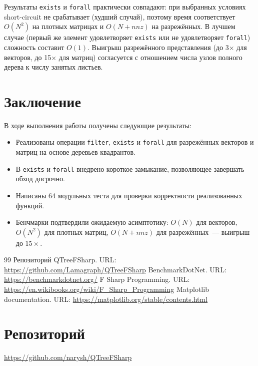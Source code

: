 \documentclass[a4paper]{article}
\begin{document}
Результаты \texttt{exists} и \texttt{forall} практически совпадают: при выбранных условиях short-circuit не срабатывает (худший случай), поэтому время соответствует $O(N^2)$ на плотных матрицах и $O(N+nnz)$ на разрежённых. В лучшем случае (первый же элемент удовлетворяет \texttt{exists} или не удовлетворяет \texttt{forall}) сложность составит $O(1)$. Выигрыш разрежённого представления (до 3× для векторов, до 15× для матриц) согласуется с отношением числа узлов полного дерева к числу занятых листьев.

\section{Заключение}

В ходе выполнения работы получены следующие результаты:

\begin{itemize}
    \item Реализованы операции \texttt{filter}, \texttt{exists} и \texttt{forall} для разрежённых векторов и матриц на основе деревьев квадрантов.
    \item В \texttt{exists} и \texttt{forall} внедрено короткое замыкание, позволяющее завершать обход досрочно.
    \item Написаны 64 модульных теста для проверки корректности реализованных функций.
    \item Бенчмарки подтвердили ожидаемую асимптотику: $O(N)$ для векторов, $O(N^2)$ для плотных матриц, $O(N+nnz)$ для разрежённых~--- выигрыш до $15\times$.
\end{itemize}

\begin{thebibliography}{99}
 Репозиторий QTreeFSharp. URL: \url{https://github.com/Lamagraph/QTreeFSharp}
 BenchmarkDotNet. URL: \url{https://benchmarkdotnet.org/}
 F Sharp Programming. URL: \url{https://en.wikibooks.org/wiki/F_Sharp_Programming}
 Matplotlib documentation. URL: \url{https://matplotlib.org/stable/contents.html}
\end{thebibliography}

\section{Репозиторий}
\url{https://github.com/narysh/QTreeFSharp}
\end{document}

